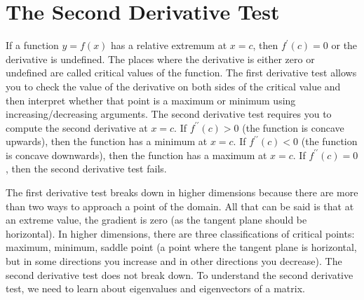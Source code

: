 
\section{The Second Derivative Test}
If a function $y=f(x)$ has a relative extremum at $x=c$, then
$f^\prime(c)=0$ or the derivative is undefined. The places where the
derivative is either zero or undefined are called critical values of
the function. The first derivative test allows you to check the value
of the derivative on both sides of the critical value and then
interpret whether that point is a maximum or minimum using
increasing/decreasing arguments.  The second derivative test requires
you to compute the second derivative at $x=c$. If $f^{\prime\prime}(c)>0$ (the
function is concave upwards), then the function has a minimum at
$x=c$. If $f^{\prime\prime}(c)<0$ (the function is concave downwards), then the
function has a maximum at $x=c$. If $f^{\prime\prime}(c)=0$, then the second
derivative test fails.

The first derivative test breaks down in higher dimensions because
there are more than two ways to approach a point of the domain. All that
can be said is that at an extreme value, the gradient is zero (as the
tangent plane should be horizontal). In higher dimensions, there are
three classifications of critical points: maximum, minimum, saddle
point (a point where the tangent plane is horizontal, but in some
directions you increase and in other directions you decrease). The
second derivative test does not break down. To understand the second
derivative test, we need to learn about eigenvalues and eigenvectors
of a matrix.

